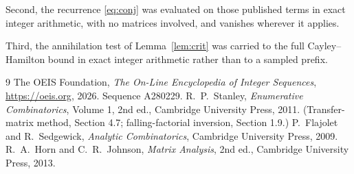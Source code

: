 \documentclass[11pt,a4paper]{article}
\theoremstyle{plain}
\theoremstyle{definition}
\begin{document}
Second, the recurrence \eqref{eq:conj} was evaluated on those published terms in exact
integer arithmetic, with no matrices involved, and vanishes wherever it applies.

Third, the annihilation test of Lemma~\ref{lem:crit} was carried to the full
Cayley--Hamilton bound in exact integer arithmetic rather than to a sampled prefix.

\begin{thebibliography}{9}
 The OEIS Foundation, \emph{The On-Line Encyclopedia of Integer
Sequences}, \url{https://oeis.org}, 2026. Sequence A280229.
 R.~P.~Stanley, \emph{Enumerative Combinatorics}, Volume 1, 2nd ed.,
Cambridge University Press, 2011. (Transfer-matrix method, Section 4.7; falling-factorial
inversion, Section 1.9.)
 P.~Flajolet and R.~Sedgewick, \emph{Analytic Combinatorics}, Cambridge
University Press, 2009.
 R.~A.~Horn and C.~R.~Johnson, \emph{Matrix Analysis}, 2nd ed., Cambridge
University Press, 2013.
\end{thebibliography}
\end{document}
